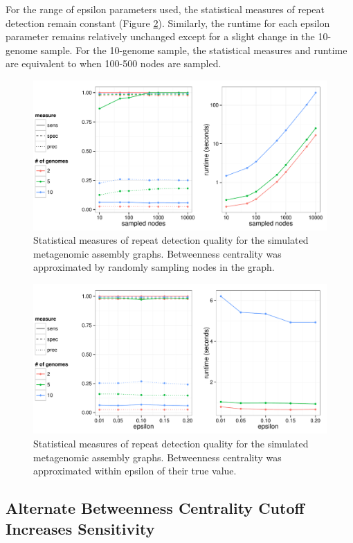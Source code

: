 \documentclass[runningheads,a4paper]{llncs}
\begin{document}
For the range of epsilon parameters used, the statistical measures of repeat detection remain constant (Figure \ref{fig:sampled_paths}).
Similarly, the runtime for each epsilon parameter remains relatively unchanged except for a slight change in the 10-genome sample.
For the 10-genome sample, the statistical measures and runtime are equivalent to when 100-500 nodes are sampled.

\begin{figure}[htbp]
\centering
\includegraphics[width = \textwidth]{sampled_nodes}
\caption{Statistical measures of repeat detection quality for the simulated metagenomic assembly graphs. Betweenness centrality was approximated by randomly sampling nodes in the graph.}
\label{fig:sampled_nodes}
\end{figure}

\begin{figure}[htbp]
\centering
\includegraphics[width = \textwidth]{sampled_paths}
\caption{Statistical measures of repeat detection quality for the simulated metagenomic assembly graphs. Betweenness centrality was approximated within epsilon of their true value.}
\label{fig:sampled_paths}
\end{figure}

\subsection*{Alternate Betweenness Centrality Cutoff Increases Sensitivity}
\end{document}
